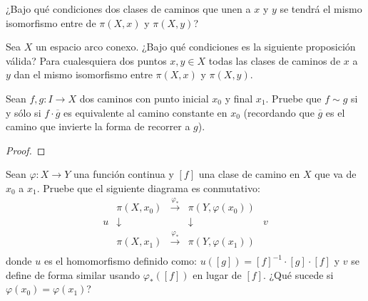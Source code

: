 \documentclass[12pt]{report}
\theoremstyle{largebreak}
\newcommand\cf[3]{\ensuremath{#1:#2\rightarrow#3}}
\begin{document}
    \begin{excer}
        ¿Bajo qué condiciones dos clases de caminos que unen a $x$ y $y$ se tendrá el mismo isomorfismo entre de $\pi(X,x)$ y $\pi(X,y)$?
    \end{excer}

    \begin{sol}
        
    \end{sol}

    \begin{excer}
        Sea $X$ un espacio arco conexo. ¿Bajo qué condiciones es la siguiente proposición válida? Para cualesquiera dos puntos $x,y\in X$ todas las clases de caminos de $x$ a $y$ dan el mismo isomorfismo entre $\pi(X,x)$ y $\pi(X,y)$. 
    \end{excer}

    \begin{sol}
        
    \end{sol}

    \begin{excer}
        Sean $\cf{f,g}{I}{X}$ dos caminos con punto inicial $x_0$ y final $x_1$. Pruebe que $f\sim g$ si y sólo si $f\cdot\overline{g}$ es equivalente al camino constante en $x_0$ (recordando que $\overline{g}$ es el camino que invierte la forma de recorrer a $g$).
    \end{excer}

    \begin{proof}
        
    \end{proof}

    \begin{excer}
        Sean $\cf{\varphi}{X}{Y}$ una función continua y $[f]$ una clase de camino en $X$ que va de $x_0$ a $x_1$. Pruebe que el siguiente diagrama es conmutativo:
        \begin{equation*}
            \begin{array}{rcccl}
              & \pi(X,x_0) & \overset{\varphi_*}{\longrightarrow} & \pi(Y,\varphi(x_0)) & \\
              u & \downarrow & & \downarrow & v \\
               & \pi(X,x_1) & \overset{\varphi_*}{\longrightarrow} & \pi(Y,\varphi(x_1)) & \\
            \end{array}
        \end{equation*}
        donde $u$ es el homomorfismo definido como: $u([g])=[f]^{-1}\cdot[g]\cdot[f]$ y $v$ se define de forma similar usando $\varphi_*([f])$ en lugar de $[f]$. ¿Qué sucede si $\varphi(x_0)=\varphi(x_1)$?
    \end{excer}
\end{document}
